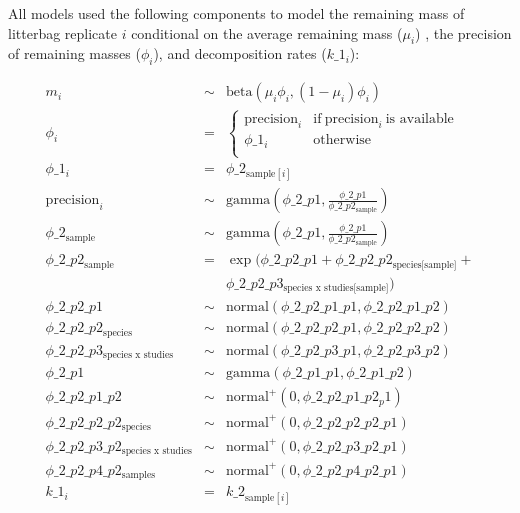 \documentclass[
  12pt,
]{article}
\begin{document}
All models used the following components to model the remaining mass of litterbag replicate \(i\) conditional on the average remaining mass (\(\mu_i\)) , the precision of remaining masses (\(\phi_i\)), and decomposition rates (\(k\_1_i\)):

\begin{equation}
\begin{aligned}
m_i & \sim & \text{beta}(\mu_i\phi_{i},(1 - \mu_i)\phi_{i})\\
\phi_{i} & = & \begin{cases}
\text{precision}_i & \text{if}~\text{precision}_i~\text{is available}\\
\phi\_1_{i} & \text{otherwise}\\
\end{cases}\\
\phi\_1_{i} & = & \phi\_2_{\text{sample}[i]}\\
\text{precision}_i & \sim & \text{gamma}\left(\phi\_2\_p1, \frac{\phi\_2\_p1}{\phi\_2\_p2_{\text{sample}}}\right)\\
\phi\_2_{\text{sample}} & \sim & \text{gamma}\left(\phi\_2\_p1, \frac{\phi\_2\_p1}{\phi\_2\_p2_{\text{sample}}}\right)\\
\phi\_2\_p2_{\text{sample}} & = & \exp(\phi\_2\_p2\_p1 + \phi\_2\_p2\_p2_{\text{species[sample]}} + \\
                                && \phi\_2\_p2\_p3_{\text{species x studies[sample]}})\\
\phi\_2\_p2\_p1 & \sim & \text{normal}(\phi\_2\_p2\_p1\_p1, \phi\_2\_p2\_p1\_p2)\\
\phi\_2\_p2\_p2_{\text{species}} & \sim & \text{normal}(\phi\_2\_p2\_p2\_p1, \phi\_2\_p2\_p2\_p2)\\
\phi\_2\_p2\_p3_{\text{species x studies}} & \sim & \text{normal}(\phi\_2\_p2\_p3\_p1, \phi\_2\_p2\_p3\_p2)\\
\phi\_2\_p1 & \sim & \text{gamma}(\phi\_2\_p1\_p1, \phi\_2\_p1\_p2)\\
\phi\_2\_p2\_p1\_p2 & \sim & \text{normal}^+(0, \phi\_2\_p2\_p1\_p2_p1)\\
\phi\_2\_p2\_p2\_p2_{\text{species}} & \sim & \text{normal}^+(0, \phi\_2\_p2\_p2\_p2\_p1)\\
\phi\_2\_p2\_p3\_p2_{\text{species x studies}} & \sim & \text{normal}^+(0, \phi\_2\_p2\_p3\_p2\_p1)\\
\phi\_2\_p2\_p4\_p2_{\text{samples}} & \sim & \text{normal}^+(0, \phi\_2\_p2\_p4\_p2\_p1)\\
k\_1_i & = & k\_2_{\text{sample}[i]}\\

\end{aligned}
\end{equation}
\end{document}
